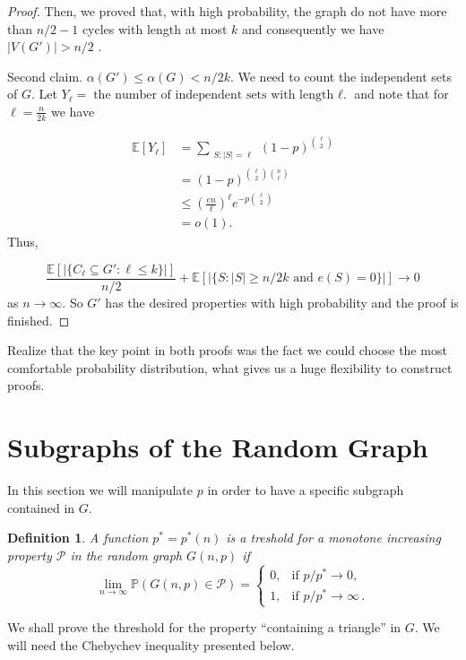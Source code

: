 \documentclass[12pt,twoside,a4paper,bibliography=totocnumbered]{book}
\numberwithin{equation}{section}
\newtheorem{definition}	[theorem] {Definition}
\theoremstyle{remark}
\begin{document}
\begin{proof}
Then, we proved that, with high probability, the graph do not have more than $n/2 -1$ cycles with length at most $k$ and consequently we have $|V(G')| > n/2$ .

Second claim. $\alpha(G') \leq \alpha(G) < n/2k$. We need to count the independent sets of $G$. Let $Y_{\ell} = \text{the number of independent sets with length ${\ell}$.}$ and note that for $\ell = \frac{n}{2k}$ we have

\begin{align*}
\mathbb{E}[Y_{\ell}] &= \sum_{\substack{S\colon|S| = {\ell}}} (1-p)^{\binom{{\ell}}{2}}\\
	       &= (1-p)^{\binom{{\ell}}{2} \binom{n}{{\ell}}} \\
	       &\leq \left(\frac{en}{{\ell}}\right)^{\ell} e^{-p\binom{{\ell}}{2}}\\
	       &=o(1).
\end{align*}
Thus,

$$\frac{\mathbb{E}[|\{C_{\ell} \subseteq G' \colon {\ell}\leq k \}|]}{n/2} + \mathbb{E} [|\{ S \colon |S| \geq n/2k \text{ and } e(S) = 0\}|] \rightarrow 0$$
as $n \rightarrow \infty $. So $G'$ has the desired properties with high probability and the proof is finished.
\end{proof}

Realize that the key point in both proofs was the fact we could choose the most comfortable probability distribution, what gives us a huge flexibility to construct proofs.

\section{Subgraphs of the Random Graph}

In this section we will manipulate $p$ in order to have a specific subgraph contained in $G$. 

\begin{definition}
A function $p^* = p^*(n)$ is a treshold for a monotone increasing property $\mathcal{P}$ in the random graph $G(n,p)$ if
$$\lim_{n \rightarrow \infty} \mathbb{P}(G(n,p)\in \mathcal{P}) =  \begin{cases}
		0, &\text{if $p/p^*\rightarrow 0$},\\
		1, &\text{if $p/p^*\rightarrow \infty$}\,.
\end{cases}$$ 
\end{definition}

We shall prove the threshold for the property ``containing a triangle'' in $G$.  We will need the Chebychev inequality presented below.
\end{document}
